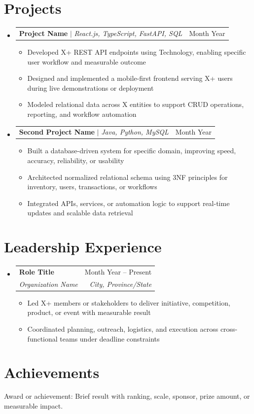 \documentclass[letterpaper,11pt]{article}
\makeatletter
\newcommand{\resumeItem}[1]{
  \item\small{
    {#1 \vspace{-2pt}}
  }
}
\newcommand{\resumeSubheading}[4]{
  \vspace{-2pt}\item
    \begin{tabular*}{0.97\textwidth}[t]{l@{\extracolsep{\fill}}r}
      \textbf{#1} & #2 \\
      \textit{\small#3} & \textit{\small #4} \\
    \end{tabular*}\vspace{-7pt}
}
\newcommand{\resumeProjectHeading}[2]{
    \item
    \begin{tabular*}{0.97\textwidth}{l@{\extracolsep{\fill}}r}
      \small#1 & #2 \\
    \end{tabular*}\vspace{-7pt}
}
\newcommand{\resumeSubHeadingListStart}{\begin{itemize}[leftmargin=0.15in, label={}]}
\newcommand{\resumeSubHeadingListEnd}{\end{itemize}}
\newcommand{\resumeItemListStart}{\begin{itemize}}
\newcommand{\resumeItemListEnd}{\end{itemize}\vspace{-5pt}}
\makeatother
\begin{document}
\section{Projects}
    \resumeSubHeadingListStart
      \resumeProjectHeading
          {\textbf{Project Name} $|$ \emph{React.js, TypeScript, FastAPI, SQL}}{Month Year}
          \resumeItemListStart
            \resumeItem{Developed X+ REST API endpoints using Technology, enabling specific user workflow and measurable outcome}
            \resumeItem{Designed and implemented a mobile-first frontend serving X+ users during live demonstrations or deployment}
            \resumeItem{Modeled relational data across X entities to support CRUD operations, reporting, and workflow automation}
          \resumeItemListEnd
      \resumeProjectHeading
          {\textbf{Second Project Name} $|$ \emph{Java, Python, MySQL}}{Month Year}
          \resumeItemListStart
            \resumeItem{Built a database-driven system for specific domain, improving speed, accuracy, reliability, or usability}
            \resumeItem{Architected normalized relational schema using 3NF principles for inventory, users, transactions, or workflows}
            \resumeItem{Integrated APIs, services, or automation logic to support real-time updates and scalable data retrieval}
          \resumeItemListEnd
    \resumeSubHeadingListEnd

\section{Leadership Experience}
  \resumeSubHeadingListStart
    \resumeSubheading
      {Role Title}{Month Year -- Present}
      {Organization Name}{City, Province/State}
      \resumeItemListStart
        \resumeItem{Led X+ members or stakeholders to deliver initiative, competition, product, or event with measurable result}
        \resumeItem{Coordinated planning, outreach, logistics, and execution across cross-functional teams under deadline constraints}
      \resumeItemListEnd
  \resumeSubHeadingListEnd

\section{Achievements}
 \begin{itemize}[leftmargin=0.15in, label={}]
    \small{\item{
     Award or achievement: Brief result with ranking, scale, sponsor, prize amount, or measurable impact.
    }}
 \end{itemize}

\end{document}
